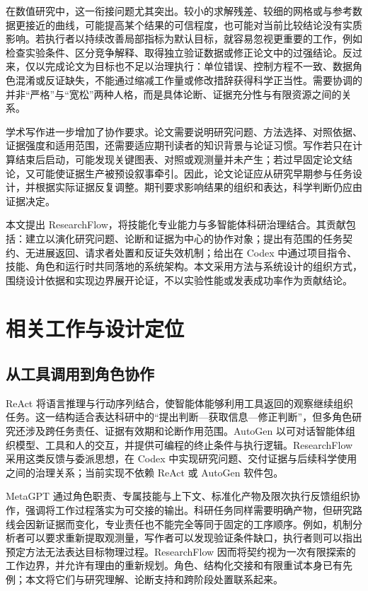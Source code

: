 \documentclass[UTF8,fontset=fandol,a4paper,11pt]{ctexart}
\begin{document}
在数值研究中，这一衔接问题尤其突出。较小的求解残差、较细的网格或与参考数据更接近的曲线，可能提高某个结果的可信程度，也可能对当前比较结论没有实质影响。若执行者以持续改善局部指标为默认目标，就容易忽视更重要的工作，例如检查实验条件、区分竞争解释、取得独立验证数据或修正论文中的过强结论。反过来，仅以完成论文为目标也不足以治理执行：单位错误、控制方程不一致、数据角色混淆或反证缺失，不能通过缩减工作量或修改措辞获得科学正当性。需要协调的并非“严格”与“宽松”两种人格，而是具体论断、证据充分性与有限资源之间的关系。

学术写作进一步增加了协作要求。论文需要说明研究问题、方法选择、对照依据、证据强度和适用范围，还需要适应期刊读者的知识背景与论证习惯。写作若只在计算结束后启动，可能发现关键图表、对照或观测量并未产生；若过早固定论文结论，又可能使证据生产被预设叙事牵引。因此，论文论证应从研究早期参与任务设计，并根据实际证据反复调整。期刊要求影响结果的组织和表达，科学判断仍应由证据决定。

本文提出 ResearchFlow，将技能化专业能力与多智能体科研治理结合。其贡献包括：建立以演化研究问题、论断和证据为中心的协作对象；提出有范围的任务契约、无进展返回、请求者处置和反证失效机制；给出在 Codex 中通过项目指令、技能、角色和运行时共同落地的系统架构。本文采用方法与系统设计的组织方式，围绕设计依据和实现边界展开论证，不以实验性能或发表成功率作为贡献结论。

\section{相关工作与设计定位}

\subsection{从工具调用到角色协作}

ReAct 将语言推理与行动序列结合，使智能体能够利用工具返回的观察继续组织任务\cite{r1}。这一结构适合表达科研中的“提出判断—获取信息—修正判断”，但多角色研究还涉及跨任务责任、证据有效期和论断作用范围。AutoGen 以可对话智能体组织模型、工具和人的交互，并提供可编程的终止条件与执行逻辑\cite{r2}。ResearchFlow 采用这类反馈与委派思想，在 Codex 中实现研究问题、交付证据与后续科学使用之间的治理关系；当前实现不依赖 ReAct 或 AutoGen 软件包。

MetaGPT 通过角色职责、专属技能与上下文、标准化产物及限次执行反馈组织协作，强调将工作过程落实为可交接的输出\cite{r3}。科研任务同样需要明确产物，但研究路线会因新证据而变化，专业责任也不能完全等同于固定的工序顺序。例如，机制分析者可以要求重新提取观测量，写作者可以发现验证条件缺口，执行者则可以指出预定方法无法表达目标物理过程。ResearchFlow 因而将契约视为一次有限探索的工作边界，并允许有理由的重新规划。角色、结构化交接和有限重试本身已有先例；本文将它们与研究理解、论断支持和跨阶段处置联系起来。
\end{document}
